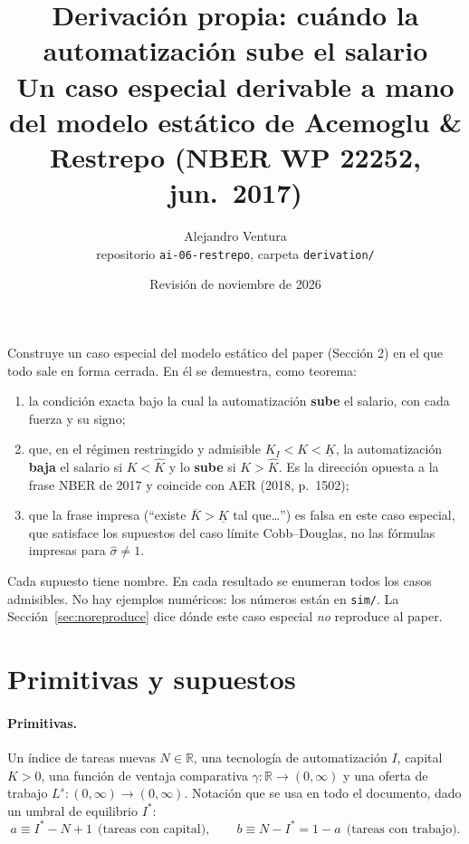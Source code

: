 \documentclass[11pt,a4paper]{article}
\title{\textbf{Derivación propia: cuándo la automatización sube el salario}\\[2pt]
\large Un caso especial derivable a mano del modelo estático de Acemoglu \& Restrepo (NBER WP 22252, jun.\ 2017)}
\author{Alejandro Ventura \\ \small repositorio \texttt{ai-06-restrepo}, carpeta \texttt{derivation/}}
\date{Revisión de noviembre de 2026}
\numberwithin{equation}{section}
\theoremstyle{definition}
\theoremstyle{plain}
\theoremstyle{remark}
\newcommand{\Is}{I^{*}}
\newcommand{\Kl}{\underline K}
\newcommand{\Kb}{\overline K}
\newcommand{\Kh}{\hat K}
\newcommand{\RR}{\mathbb{R}}
\newcommand{\sh}{\hat\sigma}
\begin{document}
\maketitle

\begin{nota}
Construye un caso especial del modelo estático del paper (Sección 2) en el que todo sale en forma cerrada.
En él se demuestra, como teorema:
\begin{enumerate}[nosep]
  \item la condición exacta bajo la cual la automatización \textbf{sube} el salario, con cada fuerza y su signo;
  \item que, en el régimen restringido y admisible $K_I<K<\Kl$, la automatización \textbf{baja} el salario si $K<\Kh$ y lo
        \textbf{sube} si $K>\Kh$. Es la dirección opuesta a la frase NBER de 2017 y coincide con AER (2018, p.~1502);
  \item que la frase impresa (``existe $\Kb>\Kl$ tal que\ldots'') es falsa en este caso especial, que satisface
        los supuestos del caso límite Cobb--Douglas, no las fórmulas impresas para $\sh\ne1$.
\end{enumerate}
Cada supuesto tiene nombre. En cada resultado se enumeran todos los casos admisibles. No hay ejemplos numéricos:
los números están en \texttt{sim/}. La Sección~\ref{sec:noreproduce} dice dónde este caso especial \emph{no}
reproduce al paper.
\end{nota}

\tableofcontents

\section{Primitivas y supuestos}

\paragraph{Primitivas.} Un índice de tareas nuevas $N\in\RR$, una tecnología de automatización $I$, capital
$K>0$, una función de ventaja comparativa $\gamma:\RR\to(0,\infty)$ y una oferta de trabajo
$L^s:(0,\infty)\to(0,\infty)$. Notación que se usa en todo el documento, dado un umbral de equilibrio $\Is$:
\begin{equation}\label{eq:ab}
  a\equiv \Is-N+1\ \ \text{(tareas con capital)},\qquad b\equiv N-\Is=1-a\ \ \text{(tareas con trabajo)}.
\end{equation}
\end{document}
